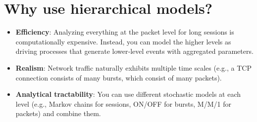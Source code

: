 \section*{Why use hierarchical models?}

\begin{itemize}
    \item \textbf{Efficiency}: Analyzing everything at the packet level for long sessions is computationally expensive. Instead, you can model the higher levels as driving processes that generate lower‑level events with aggregated parameters.
    \item \textbf{Realism}: Network traffic naturally exhibits multiple time scales (e.g., a TCP connection consists of many bursts, which consist of many packets).
    \item \textbf{Analytical tractability}: You can use different stochastic models at each level (e.g., Markov chains for sessions, ON/OFF for bursts, M/M/1 for packets) and combine them.
\end{itemize}